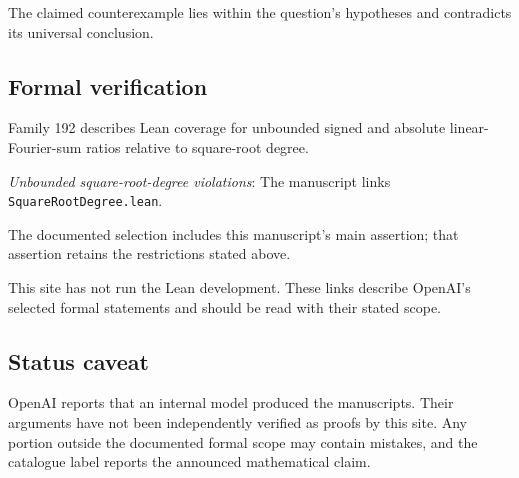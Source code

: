 \documentclass[11pt]{article}
\begin{document}
The claimed counterexample lies within the question’s hypotheses and contradicts its universal conclusion.

\subsection{Formal verification}
Family 192 describes Lean coverage for unbounded signed and absolute linear-Fourier-sum ratios relative to square-root degree.

\textit{Unbounded square-root-degree violations}: The manuscript links \texttt{SquareRootDegree.lean}.

The documented selection includes this manuscript’s main assertion; that assertion retains the restrictions stated above.

This site has not run the Lean development. These links describe OpenAI’s selected formal statements and should be read with their stated scope.

\subsection{Status caveat}
OpenAI reports that an internal model produced the manuscripts. Their arguments have not been independently verified as proofs by this site. Any portion outside the documented formal scope may contain mistakes, and the catalogue label reports the announced mathematical claim.
\end{document}

